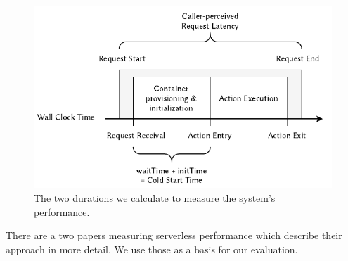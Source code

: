 \begin{figure}
    \begin{center}
        \includegraphics{figures/EvaluationTimeMeasurement.pdf}
    \end{center}
    \caption{The two durations we calculate to measure the system's performance.}
    \label{fig:evaluation-time-measurement}
\end{figure}





There are a two papers measuring serverless performance which describe their approach in more detail. We use those as a basis for our evaluation.

